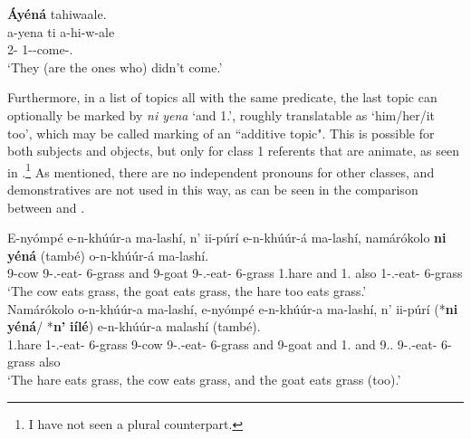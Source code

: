 \documentclass[output=paper]{langscibook}
\begin{document}
\ex
\label{bkm:Ref110501192}
\textbf{Áyéná} tahiwaale.\\
\gll
a-yena  ti  a-hi-w-ale\\
2-\PRO{}  \COP{}  1-\NEG{}-come-\PFV{}.\REL{}\\
\glt
‘They (are the ones who) didn’t come.’\\
\z

Furthermore, in a list of topics all with the same predicate, the last topic can optionally be marked by \textit{ni yena} ‘and 1.\PRO{}’, roughly translatable as ‘him/her/it too’, which may be called marking of an ``additive topic". This is possible for both subjects and objects, but only for class 1 referents that are animate, as seen in .\footnote{I have not seen a plural counterpart.} As mentioned, there are no independent pronouns for other classes, and demonstratives are not used in this way, as can be seen in the comparison between  and .

\ea
\label{bkm:Ref109481398}
\ea
\label{bkm:Ref109481398:a}
\gll
E-nyómpé  e-n-khúúr-a  ma-lashí,      n’  ii-púrí  e-n-khúúr-á  ma-lashí,      namárókolo  \textbf{ni}  \textbf{yéná}  (també)  o-n-khúúr-á  ma-lashí.\\
9-cow  9\SM{}-\PRS{}.\CJ{}-eat-\FV{}  6-grass and  9-goat  9\SM{}-\PRS{}.\CJ{}-eat-\FV{}  6-grass 1.hare  and  1.\PRO{}  {\db}also  1\SM{}-\PRS{}.\CJ{}-eat-\FV{}  6-grass\\
\glt
‘The cow eats grass, the goat eats grass, the hare too eats grass.’\\

\ex
\label{bkm:Ref109481398:b}
\gll
Namárókolo  o-n-khúúr-a  ma-lashí,      e-nyómpé  e-n-khúúr-a  ma-lashí,      n’  ii-púrí  (*\textbf{ni}  \textbf{yéná}/  *\textbf{n’}  \textbf{iílé})  e-n-khúúr-a  malashí  (també).\\
1.hare  1\SM{}-\PRS{}.\CJ{}-eat-\FV{}  6-grass   9-cow  9\SM{}-\PRS{}.\CJ{}-eat-\FV{}  6-grass  {\db}and  9-goat  and  1.\PRO{}  and  9.\DEM{}.\DIST{}  9\SM{}-\PRS{}.\CJ{}-eat-\FV{}  6-grass  {\db}also\\
\glt ‘The hare eats grass, the cow eats grass, and the goat eats grass (too).’

\z
\end{document}
